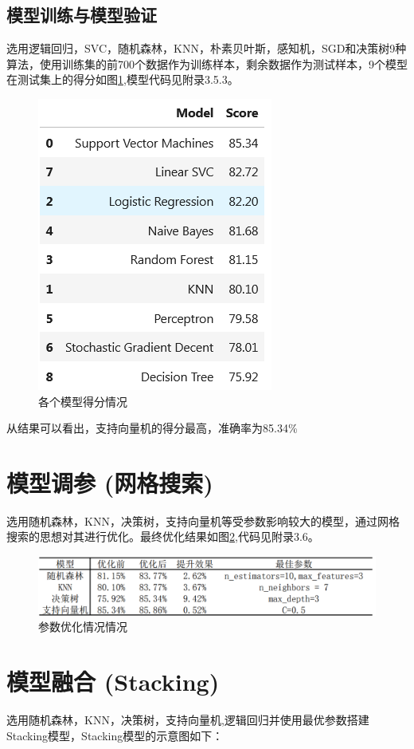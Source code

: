 \subsection{模型训练与模型验证}
选用逻辑回归，SVC，随机森林，KNN，朴素贝叶斯，感知机，SGD和决策树9种算法，使用训练集的前700个数据作为训练样本，剩余数据作为测试样本，9个模型在测试集上的得分如图\ref{15},模型代码见附录3.5.3。
\begin{figure}[H]
	\centering
	\includegraphics[scale=0.75,angle=0]{images/15.png}
	\caption{各个模型得分情况}
	\label{15}
\end{figure}

从结果可以看出，支持向量机的得分最高，准确率为85.34\%


\section{模型调参 (网格搜索)}
选用随机森林，KNN，决策树，支持向量机等受参数影响较大的模型，通过网格搜索的思想对其进行优化。最终优化结果如图\ref{16},代码见附录3.6。
\begin{figure}[H]
	\centering
	\includegraphics[scale=0.5,angle=0]{images/16.png}
	\caption{参数优化情况情况}
	\label{16}
\end{figure}

\section{模型融合 (Stacking)}
选用随机森林，KNN，决策树，支持向量机,逻辑回归并使用最优参数搭建Stacking模型，Stacking模型的示意图如下：



